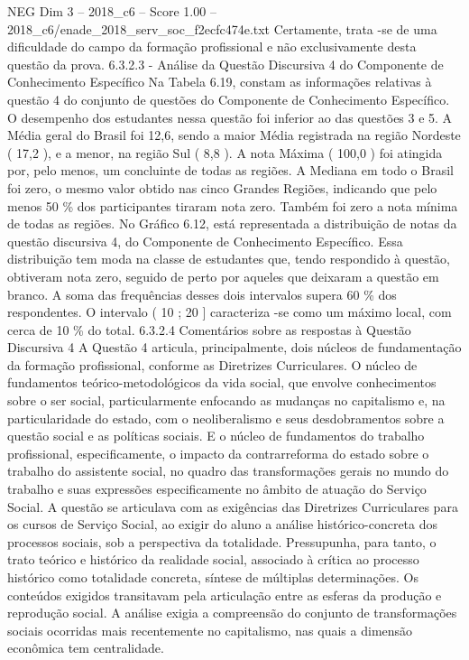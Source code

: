 \begin{textsample}{NEG Dim 3 – 2018\_c6 – Score 1.00 – 2018\_c6/enade\_2018\_serv\_soc\_f2ecfc474e.txt}
Certamente, trata -se de uma dificuldade do campo da formação profissional e não exclusivamente desta questão da prova. 6.3.2.3 - Análise da Questão Discursiva 4 do Componente de Conhecimento Específico Na Tabela 6.19, constam as informações relativas à questão 4 do conjunto de questões do Componente de Conhecimento Específico.
O desempenho dos estudantes nessa questão foi inferior ao das questões 3 e 5.
A Média geral do Brasil foi 12,6, sendo a maior Média registrada na região Nordeste ( 17,2 ), e a menor, na região Sul ( 8,8 ).
A nota Máxima ( 100,0 ) foi atingida por, pelo menos, um concluinte de todas as regiões.
A Mediana em todo o Brasil foi zero, o mesmo valor obtido nas cinco Grandes Regiões, indicando que pelo menos 50 \% dos participantes tiraram nota zero.
Também foi zero a nota mínima de todas as regiões.
No Gráfico 6.12, está representada a distribuição de notas da questão discursiva 4, do Componente de Conhecimento Específico.
Essa distribuição tem moda na classe de estudantes que, tendo respondido à questão, obtiveram nota zero, seguido de perto por aqueles que deixaram a questão em branco.
A soma das frequências desses dois intervalos supera 60 \% dos respondentes.
O intervalo ( 10 ; 20 ] caracteriza -se como um máximo local, com cerca de 10 \% do total. 6.3.2.4 Comentários sobre as respostas à Questão Discursiva 4 A Questão 4 articula, principalmente, dois núcleos de fundamentação da formação profissional, conforme as Diretrizes Curriculares.
O núcleo de fundamentos teórico-metodológicos da vida social, que envolve conhecimentos sobre o ser social, particularmente enfocando as mudanças no capitalismo e, na particularidade do estado, com o neoliberalismo e seus desdobramentos sobre a questão social e as políticas sociais.
E o núcleo de fundamentos do trabalho profissional, especificamente, o impacto da contrarreforma do estado sobre o trabalho do assistente social, no quadro das transformações gerais no mundo do trabalho e suas expressões especificamente no âmbito de atuação do Serviço Social.
A questão se articulava com as exigências das Diretrizes Curriculares para os cursos de Serviço Social, ao exigir do aluno a análise histórico-concreta dos processos sociais, sob a perspectiva da totalidade.
Pressupunha, para tanto, o trato teórico e histórico da realidade social, associado à crítica ao processo histórico como totalidade concreta, síntese de múltiplas determinações.
Os conteúdos exigidos transitavam pela articulação entre as esferas da produção e reprodução social.
A análise exigia a compreensão do conjunto de transformações sociais ocorridas mais recentemente no capitalismo, nas quais a dimensão econômica tem centralidade.

\end{textsample}
